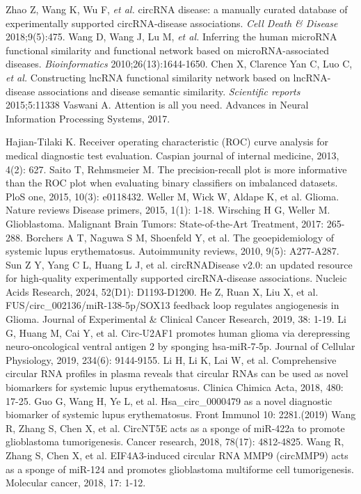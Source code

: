 \documentclass{bioinfo}
\begin{document}
\begin{thebibliography}{}
Zhao Z, Wang K, Wu F, {\it et al.} circRNA disease: a manually curated database of experimentally supported circRNA-disease associations. {\it Cell Death \& Disease} 2018;9(5):475.
Wang D, Wang J, Lu M, {\it et al.} Inferring the human microRNA functional similarity and functional network based on microRNA-associated diseases. {\it Bioinformatics} 2010;26(13):1644-1650.
Chen X, Clarence Yan C, Luo C, {\it et al.} Constructing lncRNA functional similarity network based on lncRNA-disease associations and disease semantic similarity. {\it Scientific reports} 2015;5:11338
Vaswani A. Attention is all you need. Advances in Neural Information Processing Systems, 2017.

Hajian-Tilaki K. Receiver operating characteristic (ROC) curve analysis for medical diagnostic test evaluation. Caspian journal of internal medicine, 2013, 4(2): 627.
Saito T, Rehmsmeier M. The precision-recall plot is more informative than the ROC plot when evaluating binary classifiers on imbalanced datasets. PloS one, 2015, 10(3): e0118432.
%
Weller M, Wick W, Aldape K, et al. Glioma. Nature reviews Disease primers, 2015, 1(1): 1-18.
%
Wirsching H G, Weller M. Glioblastoma. Malignant Brain Tumors: State-of-the-Art Treatment, 2017: 265-288.
%
Borchers A T, Naguwa S M, Shoenfeld Y, et al. The geoepidemiology of systemic lupus erythematosus. Autoimmunity reviews, 2010, 9(5): A277-A287.
Sun Z Y, Yang C L, Huang L J, et al. circRNADisease v2.0: an updated resource for high-quality experimentally supported circRNA-disease associations. Nucleic Acids Research, 2024, 52(D1): D1193-D1200.
%
He Z, Ruan X, Liu X, et al. FUS/circ\_002136/miR-138-5p/SOX13 feedback loop regulates angiogenesis in Glioma. Journal of Experimental \& Clinical Cancer Research, 2019, 38: 1-19.
Li G, Huang M, Cai Y, et al. Circ‐U2AF1 promotes human glioma via derepressing neuro‐oncological ventral antigen 2 by sponging hsa‐miR‐7‐5p. Journal of Cellular Physiology, 2019, 234(6): 9144-9155.
Li H, Li K, Lai W, et al. Comprehensive circular RNA profiles in plasma reveals that circular RNAs can be used as novel biomarkers for systemic lupus erythematosus. Clinica Chimica Acta, 2018, 480: 17-25.
Guo G, Wang H, Ye L, et al. Hsa\_circ\_0000479 as a novel diagnostic biomarker of systemic lupus erythematosus. Front Immunol 10: 2281.(2019)
Wang R, Zhang S, Chen X, et al. CircNT5E acts as a sponge of miR-422a to promote glioblastoma tumorigenesis. Cancer research, 2018, 78(17): 4812-4825.
Wang R, Zhang S, Chen X, et al. EIF4A3-induced circular RNA MMP9 (circMMP9) acts as a sponge of miR-124 and promotes glioblastoma multiforme cell tumorigenesis. Molecular cancer, 2018, 17: 1-12.
\end{thebibliography}
\end{document}

